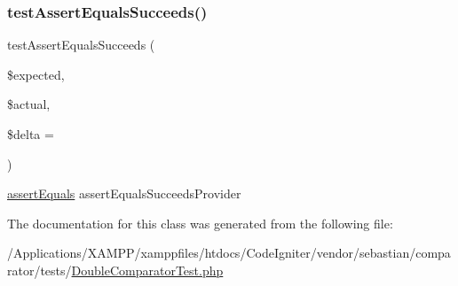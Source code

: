 \subsubsection{\texorpdfstring{test\+Assert\+Equals\+Succeeds()}{testAssertEqualsSucceeds()}}
{\footnotesize\ttfamily test\+Assert\+Equals\+Succeeds (\begin{DoxyParamCaption}\item[{}]{\$expected,  }\item[{}]{\$actual,  }\item[{}]{\$delta = {} }\end{DoxyParamCaption})}

\mbox{\hyperlink{_functions_8php_a441ec5f09711b6271edda774132eec5f}{assert\+Equals}}  assert\+Equals\+Succeeds\+Provider 

The documentation for this class was generated from the following file\+:\begin{DoxyCompactItemize}
\item 
/\+Applications/\+X\+A\+M\+P\+P/xamppfiles/htdocs/\+Code\+Igniter/vendor/sebastian/comparator/tests/\mbox{\hyperlink{_double_comparator_test_8php}{Double\+Comparator\+Test.\+php}}\end{DoxyCompactItemize}

